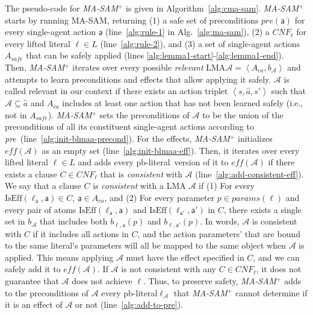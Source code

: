 \documentclass[letterpaper]{article} %
\newcommand{\pre}{\textit{pre}}
\newcommand{\eff}{\textit{eff}}
\theoremstyle{definition}
\theoremstyle{remark}
\newcommand{\tuple}[1]{\ensuremath{\left \langle #1 \right \rangle }}
\newcommand{\params}{\textit{params}}
\newcommand{\cnf}{\textit{CNF}}
\newcommand{\liftl}{\ensuremath{\ell}}
\newcommand{\lifta}{\mathsf{a}}
\newcommand{\iseff}{\text{IsEff}}
\newcommand{\masam}{\ac{MA-SAM}\xspace}
\newcommand{\cmasam}{\textit{MA-SAM\ensuremath{^+}}\xspace}
\newcommand{\blmaa}{\ac{LMA}\xspace}
\newcommand{\pbl}{pb-literal\xspace}
\begin{document}
The pseudo-code for \cmasam is given in Algorithm~\ref{alg:cma-sam}.
\cmasam starts by running \masam, returning (1) a safe set of preconditions $\pre(\lifta)$ for every single-agent action $\lifta$ (line~\ref{alg:rule-1} in Alg.~\ref{alg:ma-sam}),
(2) a $CNF_{\liftl}$ for every lifted literal $\liftl \in L$  (line~\ref{alg:rule-2}),
and (3) a set of single-agent actions $A_{safe}$ that can be safely applied (lines \ref{alg:lemma1-start}-\ref{alg:lemma1-end}).
Then, \cmasam iterates over every possible \emph{relevant} \blmaa $\mathcal{A}=\tuple{A_{ca},b_\mathcal{A}}$ and attempts to learn preconditions and effects that allow applying it safely.
$\mathcal{A}$ is called relevant in our context if there exists an action triplet $\tuple{s,\hat{a},s'}$ such that
$\mathcal{A} \subseteq \hat{a}$ and $A_{ca}$ includes at least one action that has not been learned safely (i.e., not in $A_{safe}$).
\cmasam sets the preconditions of $\mathcal{A}$ to be the union of the preconditions of all its constituent single-agent actions according to \pre\ (line~\ref{alg:init-blmaa-precond}).
For the effects, \cmasam initializes $\eff(\mathcal{A})$ as an empty set (line~\ref{alg:init-blmaa-eff}).
Then, it iterates over every lifted literal $\liftl\in L$ and adds every \pbl\ version of it to $\eff(\mathcal{A})$ if there exists a clause $C\in \cnf_{\liftl}$ that is \textit{consistent} with $\mathcal{A}$ (line~\ref{alg:add-consistent-eff}).
We say that a clause $C$ is \emph{consistent} with a \blmaa
$\mathcal{A}$ if (1) For every $\iseff(\liftl_\lifta, \lifta)\in C$, $\lifta\in A_{ca}$,
and (2) For every parameter $p\in\params(\liftl)$ and every pair of atoms
$\iseff(\liftl_\lifta, \lifta)$ and
$\iseff(\liftl_{\lifta '}, \lifta ')$ in $C$,
there exists a single set in $b_\mathcal{A}$ that includes
both $b_{\liftl,\lifta}(p)$ and $b_{\liftl,\lifta'}(p)$.
In words, $\mathcal{A}$ is consistent with $C$ if it includes all actions in $C$, and the action parameters' that are bound to the same literal's parameters will all be mapped to the same object when $\mathcal{A}$ is applied. This means applying $\mathcal{A}$ must have the effect specified in $C$, and we can safely add it to $\eff(\mathcal{A})$.
If $\mathcal{A}$ is not consistent with any $C\in \cnf_{\liftl}$, it does not guarantee that $\mathcal{A}$ does not achieve $\liftl$. Thus, to preserve safety, \cmasam adds to the preconditions of $\mathcal{A}$ every \pbl  $\ell_\mathcal{A}$ that \cmasam cannot determine if it is an effect of $\mathcal{A}$ or not (line~\ref{alg:add-to-pre}).
\end{document}
